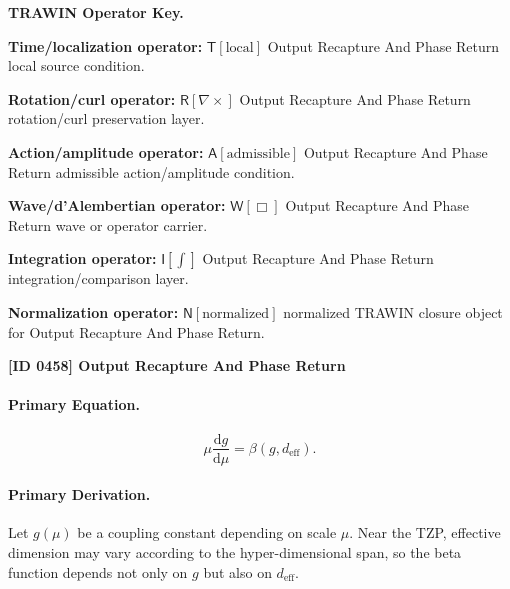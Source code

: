\par\vspace{0.45\baselineskip}
\noindent\begin{minipage}[t]{\linewidth}
\begingroup
\small
\raggedright
\textbf{TRAWIN Operator Key.}\par
\noindent\textbf{Time/localization operator:} $\mathsf{T}\!\left[\mathrm{local}\right]$ Output Recapture And Phase Return local source condition.\par
\noindent\textbf{Rotation/curl operator:} $\mathsf{R}\!\left[\nabla\times\right]$ Output Recapture And Phase Return rotation/curl preservation layer.\par
\noindent\textbf{Action/amplitude operator:} $\mathsf{A}\!\left[\mathrm{admissible}\right]$ Output Recapture And Phase Return admissible action/amplitude condition.\par
\noindent\textbf{Wave/d'Alembertian operator:} $\mathsf{W}\!\left[\Box\right]$ Output Recapture And Phase Return wave or operator carrier.\par
\noindent\textbf{Integration operator:} $\mathsf{I}\!\left[\int\right]$ Output Recapture And Phase Return integration/comparison layer.\par
\noindent\textbf{Normalization operator:} $\mathsf{N}\!\left[\mathrm{normalized}\right]$ normalized TRAWIN closure object for Output Recapture And Phase Return.\par
\endgroup
\end{minipage}

\clearpage
\noindent\textbf{[ID 0458] Output Recapture And Phase Return}\par
\vspace{0.35em}
\begingroup\small
\paragraph{Primary Equation.}
\begin{equation}
\mu\frac{\mathrm{d}g}{\mathrm{d}\mu}
=
\beta(g,d_{\mathrm{eff}}).
\end{equation}

\paragraph{Primary Derivation.}
Let $g(\mu)$ be a coupling constant depending on scale $\mu$.  
Near the TZP, effective dimension may vary according to the hyper-dimensional span, so the beta function depends not only on $g$ but also on $d_{\mathrm{eff}}$.

